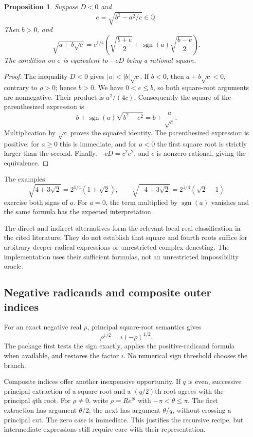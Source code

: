 \documentclass[11pt,letterpaper]{article}
\newcommand{\Q}{\mathbb{Q}}
\DeclareMathOperator{\sgn}{sgn}
\newtheorem{proposition}[theorem]{Proposition}
\theoremstyle{definition}
\theoremstyle{remark}
\begin{document}
\begin{proposition}\label{prop:indirect}
Suppose $D<0$ and
\[
 e=\sqrt{b^2-a^2/c}\in\Q.
\]
Then $b>0$, and
\begin{equation}\label{eq:indirect}
 \sqrt{a+b\sqrt c}
 =c^{1/4}\left(
 \sqrt{\frac{b+e}{2}}+\sgn(a)\sqrt{\frac{b-e}{2}}\right).
\end{equation}
The condition on $e$ is equivalent to $-cD$ being a rational square.
\end{proposition}
\begin{proof}
The inequality $D<0$ gives $|a|<|b|\sqrt c$. If $b<0$, then $a+b\sqrt c<0$, contrary to $\rho>0$; hence $b>0$. We have $0<e\le b$, so both square-root arguments are nonnegative. Their product is $a^2/(4c)$. Consequently the square of the parenthesized expression is
\[
 b+\sgn(a)\sqrt{b^2-e^2}=b+\frac{a}{\sqrt c}.
\]
Multiplication by $\sqrt c$ proves the squared identity. The parenthesized expression is positive: for $a\ge0$ this is immediate, and for $a<0$ the first square root is strictly larger than the second. Finally, $-cD=c^2e^2$, and $c$ is nonzero rational, giving the equivalence.
\end{proof}

The examples
\[
 \sqrt{4+3\sqrt2}=2^{1/4}(1+\sqrt2),\qquad
 \sqrt{-4+3\sqrt2}=2^{1/4}(\sqrt2-1)
\]
exercise both signs of $a$. For $a=0$, the term multiplied by $\sgn(a)$ vanishes and the same formula has the expected interpretation.

The direct and indirect alternatives form the relevant local real classification in the cited literature. They do not establish that square and fourth roots suffice for arbitrary deeper radical expressions or unrestricted complex denesting. The implementation uses their sufficient formulas, not an unrestricted impossibility oracle.\cite{bfht,gkioulekas}

\subsection{Negative radicands and composite outer indices}

For an exact negative real $\rho$, principal square-root semantics gives
\[
 \rho^{1/2}=i(-\rho)^{1/2}.
\]
The package first tests the sign exactly, applies the positive-radicand formula when available, and restores the factor $i$. No numerical sign threshold chooses the branch.

Composite indices offer another inexpensive opportunity. If $q$ is even, successive principal extraction of a square root and a $(q/2)$th root agrees with the principal $q$th root. For $\rho\ne0$, write $\rho=R e^{i\theta}$ with $-\pi<\theta\le\pi$. The first extraction has argument $\theta/2$; the next has argument $\theta/q$, without crossing a principal cut. The zero case is immediate. This justifies the recursive recipe, but intermediate expressions still require care with their representation.
\end{document}
